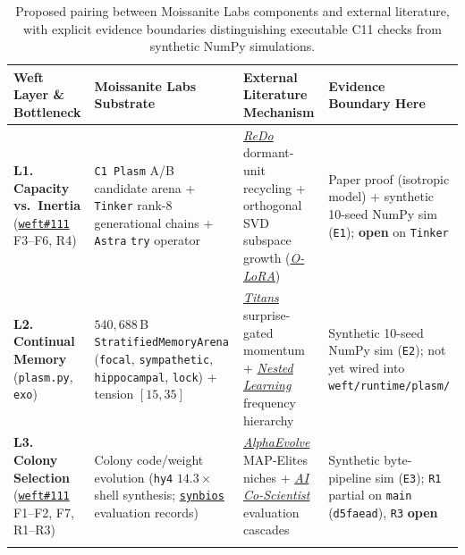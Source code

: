 \documentclass[10pt,a4paper]{article}
\begin{document}
\begin{table}[!htbp]
\centering
\caption{Proposed pairing between Moissanite Labs components and external literature, with explicit evidence boundaries distinguishing executable C11 checks from synthetic NumPy simulations.}
\label{tab:convergence}
\scriptsize
\setlength{\tabcolsep}{4pt}
\begin{tabularx}{\linewidth}{@{}>{\raggedright\arraybackslash}p{30mm} >{\raggedright\arraybackslash}X >{\raggedright\arraybackslash}X >{\raggedright\arraybackslash}p{36mm}@{}}
\toprule
\textbf{Weft Layer \& Bottleneck} & \textbf{Moissanite Labs Substrate} & \textbf{External Literature Mechanism} & \textbf{Evidence Boundary Here} \\
\midrule
\textbf{L1. Capacity vs.\ Inertia} (\href{https://github.com/Moissanite-Labs/weft/issues/111}{\texttt{weft\#111}} F3--F6, R4) & \texttt{C1 Plasm} A/B candidate arena + \texttt{Tinker} rank-8 generational chains + \texttt{Astra} \texttt{try} operator & \href{https://arxiv.org/abs/2302.12902}{\emph{ReDo}} dormant-unit recycling + orthogonal SVD subspace growth (\href{https://arxiv.org/abs/2310.14152}{\emph{O-LoRA}}) & Paper proof (isotropic model) + synthetic 10-seed NumPy sim (\texttt{E1}); \textbf{open} on \texttt{Tinker} \\
\addlinespace[2.5pt]
\textbf{L2. Continual Memory} (\texttt{plasm.py}, \texttt{exo}) & $540{,}688$\,B \texttt{Stratified}\allowbreak\texttt{MemoryArena} (\texttt{focal}, \texttt{sympathetic}, \texttt{hippocampal}, \texttt{lock}) + tension $[15,35]$ & \href{https://arxiv.org/abs/2501.00663}{\emph{Titans}} surprise-gated momentum + \href{https://arxiv.org/abs/2512.24695}{\emph{Nested Learning}} frequency hierarchy & Synthetic 10-seed NumPy sim (\texttt{E2}); not yet wired into \texttt{weft/runtime/plasm/} \\
\addlinespace[2.5pt]
\textbf{L3. Colony Selection} (\href{https://github.com/Moissanite-Labs/weft/issues/111}{\texttt{weft\#111}} F1--F2, F7, R1--R3) & Colony code/weight evolution (\texttt{hy4} $14.3\times$ shell synthesis; \href{https://github.com/Moissanite-Labs/synbios}{\texttt{synbios}} evaluation records) & \href{https://arxiv.org/abs/2506.13131}{\emph{AlphaEvolve}} MAP-Elites niches + \href{https://research.google/blog/accelerating-scientific-breakthroughs-with-an-ai-co-scientist/}{\emph{AI Co-Scientist}} evaluation cascades & Synthetic byte-pipeline sim (\texttt{E3}); \texttt{R1} partial on \texttt{main} (\texttt{d5faead}), \texttt{R3} \textbf{open} \\
\addlinespace[2.5pt]

\end{tabularx}
\end{table}
\end{document}
